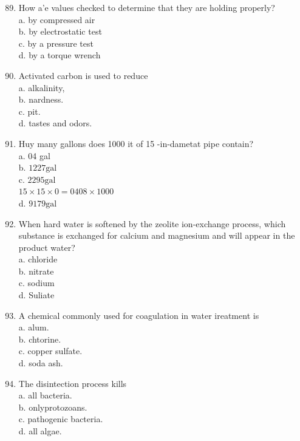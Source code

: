 \documentclass[10pt]{article}
\begin{document}
\begin{enumerate}
  \setcounter{enumi}{88}
  \item How a'e values checked to determine that they are holding properly?\\
a. by compressed air\\
b. by electrostatic test\\
c. by a pressure test\\
d. by a torque wrench

  \item Activated carbon is used to reduce\\
a. alkalinity,\\
b. nardness.\\
c. pit.\\
d. tastes and odors.

  \item Huy many gallons does 1000 it of 15 -in-dametat pipe contain?\\
a. 04 gal\\
b. $1227 \mathrm{gal}$\\
c. $2295 \mathrm{gal}$\\
$15 \times 15 \times 0=0408 \times 1000$\\
d. $9179 \mathrm{gal}$

  \item When hard water is softened by the zeolite ion-exchange process, which substance is exchanged for calcium and magnesium and will appear in the product water?\\
a. chloride\\
b. nitrate\\
c. sodium\\
d. Suliate

  \item A chemical commonly used for coagulation in water ireatment is\\
a. alum.\\
b. chtorine.\\
c. copper sulfate.\\
d. soda ash.

  \item The disintection process kills\\
a. all bacteria.\\
b. onlyprotozoans.\\
c. pathogenic bacteria.\\
d. all algae.

\end{enumerate}
\end{document}
